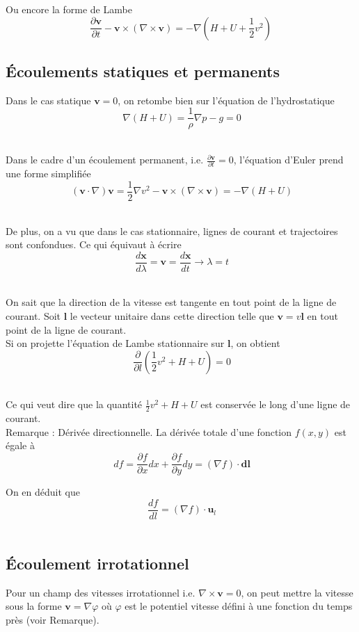 \documentclass[10pt,a4paper]{book}
\begin{document}
Ou encore la forme de Lambe
\begin{equation}
\frac{\partial \mathbf{v}}{\partial t}-\mathbf{v}\times(\nabla \times \mathbf{v})=-\nabla (H+U+ \frac{1}{2} v^2)
\end{equation}

\subsection{Écoulements statiques et permanents}

Dans le cas statique $\mathbf{v}=0$, on retombe bien sur l'équation de l'hydrostatique \[\ \nabla(H+U)=\frac{1}{\rho}\nabla p - g=0 \]\ 

Dans le cadre d'un écoulement permanent, i.e. $\frac{\partial \mathbf{v}}{\partial t}=0$, l'équation d'Euler prend une forme simplifiée \[\ (\mathbf{v}\cdot\nabla)\mathbf{v}=\frac{1}{2}\nabla v^2-\mathbf{v}\times(\nabla \times \mathbf{v})=-\nabla(H+U) \]\

De plus, on a vu que dans le cas stationnaire, lignes de courant et trajectoires sont confondues. Ce qui équivaut à écrire \[\ \frac{d \mathbf{x}}{d\lambda}=\mathbf{v}=\frac{d \mathbf{x}}{dt} \rightarrow \lambda = t \]\

On sait que la direction de la vitesse est tangente en tout point de la ligne de courant. Soit $\mathbf{l}$ le vecteur unitaire dans cette direction telle que $\mathbf{v}=v\mathbf{l}$ en tout point de la ligne de courant.\\

Si on projette l'équation de Lambe stationnaire sur $\mathbf{l}$, on obtient \[\  \frac{\partial}{\partial l}(\frac{1}{2}v^2+H+U)=0 \]\

Ce qui veut dire que la quantité $\frac{1}{2}v^2+H+U$ est conservée le long d'une ligne de courant.\\

Remarque : Dérivée directionnelle. La dérivée totale d'une fonction $f(x,y)$ est égale à \[\ df =\frac{\partial f}{\partial x}dx+\frac{\partial f}{\partial y}dy = (\nabla f)\cdot \mathbf{dl}\]

On en déduit que \[\ \frac{df}{dl}=(\nabla f)\cdot \mathbf{u}_l \]\ 

\subsection{Écoulement irrotationnel}

Pour un champ des vitesses irrotationnel i.e. $\nabla \times \mathbf{v}=0$, on peut mettre la vitesse sous la forme $\mathbf{v}=\nabla \varphi$ où $\varphi$ est le potentiel vitesse défini à une fonction du temps près (voir Remarque).\\
\end{document}
